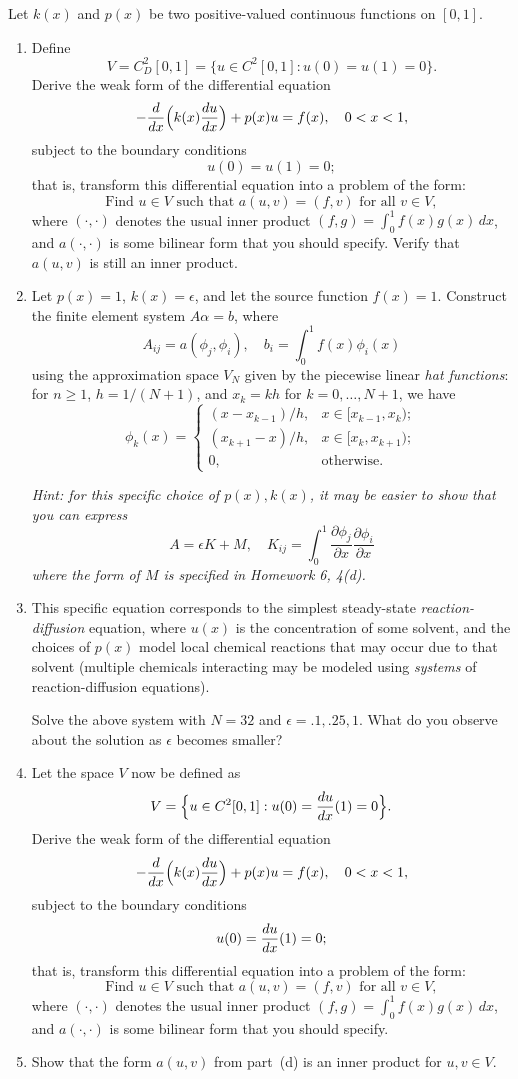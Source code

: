 Let $k(x)$ and $p(x)$ be two positive-valued continuous functions on $[0,1]$.  
\begin{enumerate}
\item Define
\[ V = C^2_D[0,1] = \Big\{ u\in C^2[0,1]: u(0) = u(1) = 0 \Big\}.\]
 Derive the weak form of the differential equation
\[ -{d\over dx} \Big(k(x) {du \over dx}\Big) + p(x) u = f(x), 
    \quad 0 < x< 1,\]
subject to the boundary conditions
\[  u(0) = u(1) = 0;\]
that is, transform this differential equation into a problem of the form:
\[\mbox{Find $u \in V$ such that $a(u,v) = (f,v)$ for all $v\in V$},\]
where $(\cdot,\cdot)$ denotes the usual inner product
$(f, g) = \int_0^1 f(x) g(x)\, dx$,
and $a(\cdot, \cdot)$ is some bilinear form that you should specify.  Verify that $a(u,v)$ is still an inner product.  
\item Let $p(x) = 1$, $k(x) = \epsilon$, and let the source function $f(x) = 1$.  Construct the finite element system $A\alpha = b$, where
\[
A_{ij} = a(\phi_j,\phi_i), \quad b_i = \int_0^1 f(x)\phi_i(x)
\]
using the approximation space $V_N$ given by the piecewise linear
\emph{hat functions}:
for $n\ge 1$,  $h = 1/(N+1)$,  and $x_k = kh$ for $k = 0, \ldots, N+1$,
we have 
\[ \phi_k(x) = \left\{ \begin{array}{ll}
           (x-x_{k-1})/h, & x\in [x_{k-1}, x_k);\\
           (x_{k+1}-x)/h, & x\in [x_k, x_{k+1});\\
            0,             & \mbox{otherwise}.
          \end{array}\right. \]
          
\emph{Hint: for this specific choice of $p(x),k(x)$, it may be easier to show that you can express
\[
A = \epsilon K + M, \quad K_{ij} = \int_0^1 \frac{\partial \phi_j}{\partial x}\frac{\partial \phi_i}{\partial x}
\]
where the form of $M$ is specified in Homework 6, 4(d).}
\item This specific equation corresponds to the simplest steady-state \emph{reaction-diffusion} equation, where $u(x)$ is the concentration of some solvent, and the choices of $p(x)$ model local chemical reactions that may occur due to that solvent (multiple chemicals interacting may be modeled using \emph{systems} of reaction-diffusion equations).  

Solve the above system with $N = 32$ and $\epsilon = .1, .25, 1$.  What do you observe about the solution as $\epsilon$ becomes smaller?
\item Let the space $V$ now be defined as
\[ V = \Big\{ u\in C^2[0,1]: u(0) = {du\over dx}(1) = 0 \Big\}.\]
Derive the weak form of the differential equation
\[ -{d\over dx} \Big(k(x) {du \over dx}\Big) + p(x) u = f(x), 
    \quad 0 < x< 1,\]
subject to the boundary conditions
\[  u(0) = {du\over dx}(1) = 0;\]
that is, transform this differential equation into a problem of the form:
\[\mbox{Find $u \in V$ such that $a(u,v) = (f,v)$ for all $v\in V$},\]
where $(\cdot,\cdot)$ denotes the usual inner product
$(f, g) = \int_0^1 f(x) g(x)\, dx$,
and $a(\cdot, \cdot)$ is some bilinear form that you should specify.

\item Show that the form $a(u,v)$ from part~(d) is an inner product
      for $u, v \in V$.
\end{enumerate}
